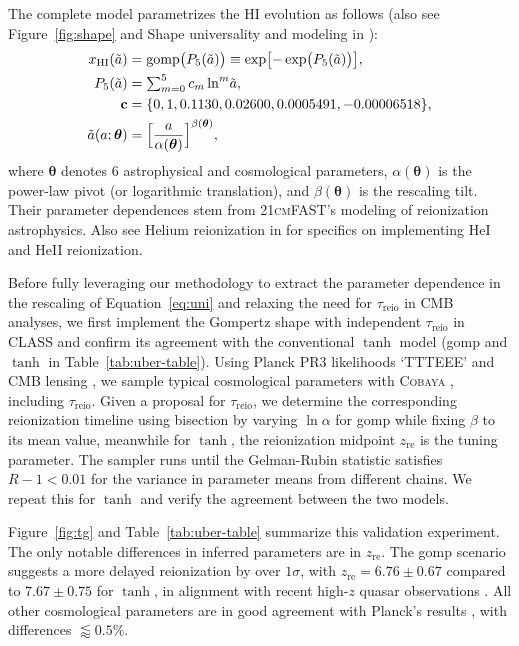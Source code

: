 \documentclass[12pt]{article}
\newcommand{\vtheta}{\boldsymbol{\theta}}
\newcommand{\HI}{\mathrm{HI}}
\newcommand{\re}{\mathrm{re}}
\newcommand{\reio}{\mathrm{reio}}
\newcommand{\ap}{\alpha}
\newcommand{\tilt}{\beta}
\newcommand{\ar}{\tilde{a}}
\newcommand{\gomp}{\mathrm{gomp}}
\begin{document}
The complete model parametrizes the HI evolution as follows (also see
Figure~\ref{fig:shape} and Shape universality and modeling in
\cite{methods}):
%
\begin{align}
\label{eq:uni}
x_\HI(\ar) &= \gomp\bigl( P_5(\ar) \bigr)
  \equiv \exp\bigl[ - \exp\bigl( P_5(\ar) \bigr) \bigr], \\
%
\label{eq:poly}
P_5(\ar) &= {\textstyle\sum}_{m=0}^5 \, c_m \ln^m\!\ar, \\
%
\mathbf{c} &= \{0, 1, 0.1130, 0.02600, 0.0005491, -0.00006518\}, \nonumber\\
%
\label{eq:map}
\ar(a; \vtheta) &= \Bigl[ \frac{a}{\ap(\vtheta)} \Bigr]^{\tilt(\vtheta)},
\end{align}
%
where $\vtheta$ denotes 6 astrophysical and cosmological parameters,
$\ap(\vtheta)$ is the power-law pivot (or logarithmic translation), and
$\tilt(\vtheta)$ is the rescaling tilt.
Their parameter dependences stem from \textsc{21cmFAST}'s modeling of
reionization astrophysics.
Also see Helium reionization in \cite{methods} for specifics on implementing HeI and
HeII reionization.

Before fully leveraging our methodology to extract the parameter
dependence in the rescaling of Equation~\eqref{eq:uni} and relaxing the need for
$\tau_\reio$ in CMB analyses, we first implement the Gompertz shape with
independent $\tau_\reio$ in \textsc{CLASS} and confirm its agreement
with the conventional $\tanh$ model (gomp and $\tanh$ in
Table~\ref{tab:uber-table}).
Using Planck PR3 likelihoods `TTTEEE' \cite{Planck2020c} and CMB lensing
\cite{Planck2020d}, we sample typical cosmological parameters with
\textsc{Cobaya} \cite{Torrado2020}, including $\tau_\reio$.
Given a proposal for $\tau_\reio$, we determine the corresponding
reionization timeline using bisection by varying $\ln\ap$ for gomp
while fixing $\beta$ to its mean value,
meanwhile for $\tanh$, the reionization midpoint $z_\re$ is the tuning
parameter.
The sampler runs until the Gelman-Rubin statistic \cite{Gelman1992}
satisfies $R - 1 < 0.01$ for the variance in parameter means from
different chains.
We repeat this for $\tanh$ and verify the agreement between the two
models.

Figure~\ref{fig:tg} and Table~\ref{tab:uber-table} summarize this
validation experiment.
The only notable differences in inferred parameters are in $z_\re$.
The gomp scenario suggests a more delayed reionization by over
$1\sigma$, with $z_\re = 6.76 \pm 0.67$ compared to $7.67 \pm 0.75$ for
$\tanh$, in alignment with recent high-$z$ quasar observations
\cite{Keating2020}.
All other cosmological parameters are in good agreement with Planck's
results \cite{Planck2020a}, with differences $\lessapprox 0.5 \%$.
\end{document}
